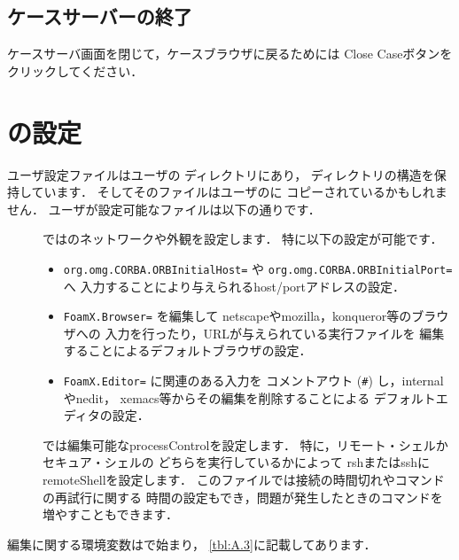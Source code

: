 \subsection{ケースサーバーの終了}
\label{ssec:A.4.9}
ケースサーバ画面を閉じて，ケースブラウザに戻るためには
Close Caseボタンをクリックしてください．



\section{の設定}
\label{sec:A.5}
ユーザ設定ファイルはユーザの
ディレクトリにあり，
ディレクトリの構造を保持しています．
そしてそのファイルはユーザのに
コピーされているかもしれません．
ユーザが設定可能なファイルは以下の通りです．
\begin{description}
 \item[]
%
%
            ではのネットワークや外観を設定します．
            特に以下の設定が可能です．
            \begin{itemize}
             \item \texttt{org.omg.CORBA.ORBInitialHost=} や
                   \texttt{org.omg.CORBA.ORBInitialPort=} へ
                   入力することにより与えられるhost/portアドレスの設定．
             \item \texttt{FoamX.Browser=} を編集して
                   netscapeやmozilla，konqueror等のブラウザへの
                   入力を行ったり，URLが与えられている実行ファイルを
                   編集することによるデフォルトブラウザの設定．
             \item \texttt{FoamX.Editor=} に関連のある入力を
                   コメントアウト (\verb|#|) し，internalやnedit，
                   xemacs等からその編集を削除することによる
                   デフォルトエディタの設定．
            \end{itemize}
 \item[]
%
%
            では編集可能なprocessControlを設定します．
            特に，リモート・シェルかセキュア・シェルの
            どちらを実行しているかによって
            rshまたはsshにremoteShellを設定します．
            このファイルでは接続の時間切れやコマンドの再試行に関する
            時間の設定もでき，問題が発生したときのコマンドを
            増やすこともできます．
\end{description}
編集に関する環境変数はで始まり，
\autoref{tbl:A.3}に記載してあります．


